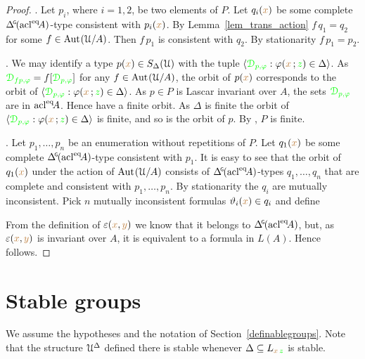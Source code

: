 \begin{proof}
  .
  Let $p_i$, where $i=1,2$, be two elements of $P$.
  Let $q_i({\color{brown} x})$ be some complete $\GDelta(\acl^\eq\!A)$-type consistent with $p_i({\color{brown} x})$.
  By Lemma~\ref{lem_trans_action} $f\,q_1=q_2$ for some $f\in{\rm Aut\kern.15ex}(\EuScript U/A)$.
  Then $f\,p_1$ is consistent with $q_2$.
  By stationarity $f\,p_1=p_2$.

  .
  We may identify a type $p({\color{brown} x})\in S_\Delta(\EuScript U)$ with the tuple $\langle{\color{green}\EuScript D_{p,\varphi}}:\varphi({\color{brown} x}\,;{\color{green} z})\in\Delta\rangle$.
  As ${\color{green}\EuScript D_{fp,\varphi}}=f[{\color{green}\EuScript D_{p,\varphi}}]$ for any $f\in{\rm Aut\kern.15ex}(\EuScript U/A)$, the orbit of $p({\color{brown} x})$ corresponds to the orbit of $\langle{\color{green}\EuScript D_{p,\varphi}}:\varphi({\color{brown} x}\,;{\color{green} z})\in\Delta\rangle$.
  As $p\in P$ is Lascar invariant over $A$, the sets ${\color{green}\EuScript D_{p,\varphi}}$ are in ${\rm acl}^{{\rm eq}}\!A$.
  Hence have a finite orbit.
  As $\Delta$ is finite the orbit of $\langle{\color{green}\EuScript D_{p,\varphi}}:\varphi({\color{brown} x}\,;{\color{green} z})\in\Delta\rangle$ is finite, and so is the orbit of $p$.
  By , $P$ is finite.

  . 
  Let $p_1,\dots,p_n$ be an enumeration without repetitions of $P$.
  Let $q_1({\color{brown} x})$ be some complete $\GDelta(\acl^\eq\!A)$-type consistent with $p_1$.
  It is easy to see that the orbit of $q_1({\color{brown} x})$ under the action of ${\rm Aut\kern.15ex}(\EuScript U/A)$ consists of $\GDelta(\acl^\eq\!A)$-types $q_1,\dots,q_n$ that are complete and consistent with $p_1,\dots,p_n$.
  By stationarity the $q_i$ are mutually inconsistent.
  Pick $n$ mutually inconsistent formulas $\vartheta_i({\color{brown} x})\in q_i$ and define

  
  From the definition of $\varepsilon({\color{brown} x},{\color{brown} y})$ we know that it belongs to $\GDelta(\acl^\eq\!A)$, but, as $\varepsilon({\color{brown} x},{\color{brown} y})$ is invariant over $A$, it is equivalent to a formula in $L(A)$.
  Hence  follows.
\end{proof}

\section{Stable groups}\label{stable_groups}

We assume the hypotheses and the notation of Section~\ref{definablegroups}.
Note that the structure $\EuScript U^\Delta$ defined there is stable whenever $\Delta\subseteq L_{{\color{brown} x}\,{\color{green} z}}$ is stable.

